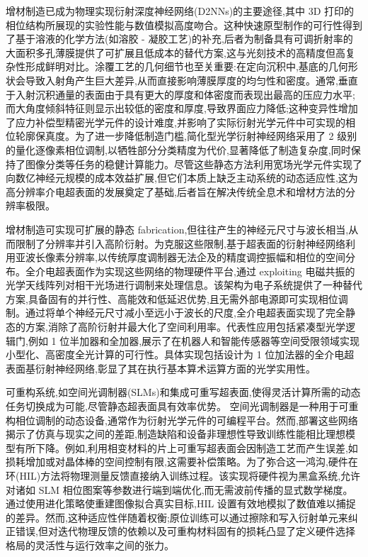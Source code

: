 \documentclass[11pt]{article}
\begin{document}
增材制造已成为物理实现衍射深度神经网络(D2NNs)的主要途径,其中 3D 打印的相位结构所展现的实验性能与数值模拟高度吻合。这种快速原型制作的可行性得到了基于溶液的化学方法(如溶胶 - 凝胶工艺)的补充,后者为制备具有可调折射率的大面积多孔薄膜提供了可扩展且低成本的替代方案,这与光刻技术的高精度但高复杂性形成鲜明对比。涂覆工艺的几何细节也至关重要:在定向沉积中,基底的几何形状会导致入射角产生巨大差异,从而直接影响薄膜厚度的均匀性和密度。通常,垂直于入射沉积通量的表面由于具有更大的厚度和体密度而表现出最高的压应力水平;而大角度倾斜特征则显示出较低的密度和厚度,导致界面应力降低;这种变异性增加了应力补偿型精密光学元件的设计难度,并影响了实际衍射光学元件中可实现的相位轮廓保真度。为了进一步降低制造门槛,简化型光学衍射神经网络采用了 2 级别的量化逐像素相位调制,以牺牲部分分类精度为代价,显著降低了制造复杂度,同时保持了图像分类等任务的稳健计算能力。尽管这些静态方法利用宽场光学元件实现了向数亿神经元规模的成本效益扩展,但它们本质上缺乏主动系统的动态适应性,这为高分辨率介电超表面的发展奠定了基础,后者旨在解决传统全息术和增材方法的分辨率极限。\citep{doi_10_1126_science_aat8084_e055772d} \citep{doi_10_1038_s41598_025_33607_1_2162f081} \citep{doi_10_1002_lpor_202402303_1f555bd4} \citep{doi_10_1116_1_5011790_9ce3fdef}

增材制造可实现可扩展的静态 fabrication,但往往产生的神经元尺寸与波长相当,从而限制了分辨率并引入高阶衍射。为克服这些限制,基于超表面的衍射神经网络利用亚波长像素分辨率,以传统厚度调制器无法企及的精度调控振幅和相位的空间分布。全介电超表面作为实现这些网络的物理硬件平台,通过 exploiting 电磁共振的光学天线阵列对相干光场进行调制来处理信息。该架构为电子系统提供了一种替代方案,具备固有的并行性、高能效和低延迟优势,且无需外部电源即可实现相位调制。通过将单个神经元尺寸减小至远小于波长的尺度,全介电超表面实现了完全静态的方案,消除了高阶衍射并最大化了空间利用率。代表性应用包括紧凑型光学逻辑门,例如 1 位半加器和全加器,展示了在机器人和智能传感器等空间受限领域实现小型化、高密度全光计算的可行性。具体实现包括设计为 1 位加法器的全介电超表面基衍射神经网络,彰显了其在执行基本算术运算方面的光学实用性。\citep{doi_10_1515_nanoph_2023_0760_2c3ec088} \citep{doi_10_3390_nano14221812_4d7d91b1} \citep{doi_10_1515_nanoph_2023_0760_2c3ec088} \citep{doi_10_1117_12_2688132_926a2697}

可重构系统,如空间光调制器(SLMs)和集成可重写超表面,使得灵活计算所需的动态任务切换成为可能,尽管静态超表面具有效率优势。\citep{doi_10_1002_adom_202300561_c4d7a5b0} \citep{doi_10_32446_0368_1025it_2023_12_35_39_fb1bb2c3} 空间光调制器是一种用于可重构相位调制的动态设备,通常作为衍射光学元件的可编程平台。然而,部署这些网络揭示了仿真与现实之间的差距,制造缺陷和设备非理想性导致训练性能相比理想模型有所下降。例如,利用相变材料的片上可重写超表面会因制造工艺而产生误差,如损耗增加或对晶体棒的空间控制有限,这需要补偿策略。为了弥合这一鸿沟,硬件在环(HIL)方法将物理测量反馈直接纳入训练过程。该实现将硬件视为黑盒系统,允许对诸如 SLM 相位图案等参数进行端到端优化,而无需波前传播的显式数学梯度。通过使用进化策略使重建图像拟合真实目标,HIL 设置有效地模拟了数值难以捕捉的差异。然而,这种适应性伴随着权衡;原位训练可以通过擦除和写入衍射单元来纠正错误,但对迭代物理反馈的依赖以及可重构材料固有的损耗凸显了定义硬件选择格局的灵活性与运行效率之间的张力。\citep{doi_10_1038_s41598_025_19638_8_1b2db1c9} \citep{doi_10_1364_oe_461549_b2d41b3f}
\end{document}
